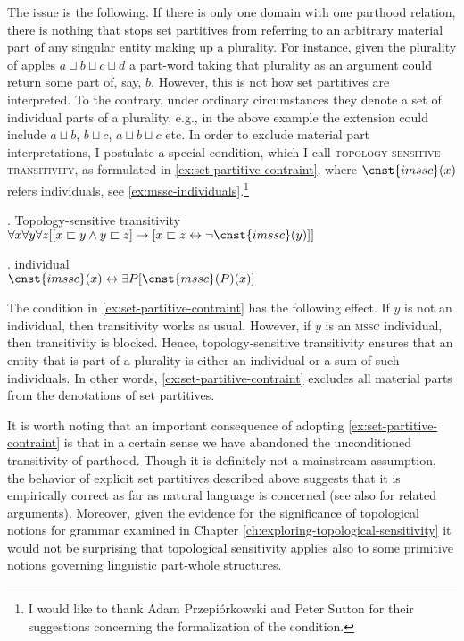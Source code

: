 	The issue is the following. If there is only one domain with one parthood relation, there is nothing that stops set partitives from referring to an arbitrary material part of any singular entity making up a plurality. For instance, given the plurality of apples $a\sqcup b\sqcup c\sqcup d$ a part-word taking that plurality as an argument could return some part of, say, $b$. However, this is not how set partitives are interpreted. To the contrary, under ordinary circumstances they denote a set of individual parts of a plurality, e.g., in the above example the extension could include $a\sqcup b$, $b\sqcup c$, $a\sqcup b\sqcup c$ etc. In order to exclude material part interpretations, I postulate a special condition, which I call \textsc{topology-sensitive transitivity}, as formulated in \ref{ex:set-partitive-contraint}, where $\cnst{imssc}(x)$ refers  individuals, see \ref{ex:mssc-individuals}.\footnote{I would like to thank Adam Przepiórkowski and Peter Sutton for their suggestions concerning the formalization of the condition.} 
	
	\ex. Topology-sensitive transitivity\\
	$\forall x \forall y \forall z[ [x \sqsubset y \wedge y \sqsubset z] \rightarrow [x \sqsubset z \leftrightarrow \neg\cnst{imssc}(y)] ]$\label{ex:set-partitive-contraint}
	
	\ex.  individual\\
	$\cnst{imssc}(x) \leftrightarrow \exists P[\cnst{mssc}(P)(x)]$\label{ex:mssc-individuals}
	
	The condition in \ref{ex:set-partitive-contraint} has the following effect. If $y$ is not an  individual, then transitivity works as usual. However, if $y$ is an \textsc{mssc} individual, then transitivity is blocked. Hence, topology-sensitive transitivity ensures that an entity that is part of a plurality is either an  individual or a sum of such individuals. In other words, \ref{ex:set-partitive-contraint} excludes all material parts from the denotations of set partitives.
	
	It is worth noting that an important consequence of adopting \ref{ex:set-partitive-contraint} is that in a certain sense we have abandoned the unconditioned transitivity of parthood. Though it is definitely not a mainstream assumption, the behavior of explicit set partitives described above suggests that it is empirically correct as far as natural language is concerned (see also \citealt{moltmann1997parts} for related arguments). Moreover, given the evidence for the significance of topological notions for grammar examined in Chapter \ref{ch:exploring-topological-sensitivity} it would not be surprising that topological sensitivity applies also to some primitive notions governing linguistic part-whole structures. 
	
